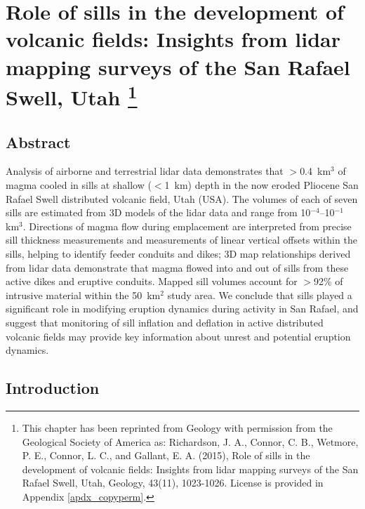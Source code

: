\chapter[Role of sills in the development of volcanic fields: Insights from lidar mapping surveys of the San Rafael Swell, Utah]{Role of sills in the development of volcanic fields: Insights from lidar mapping surveys of the San Rafael Swell, Utah \footnote{This chapter has been reprinted from Geology with permission from the Geological Society of America as: Richardson, J. A., Connor, C. B., Wetmore, P. E., Connor, L. C., and Gallant, E. A. (2015), Role of sills in the development of volcanic fields: Insights from lidar mapping surveys of the San Rafael Swell, Utah, Geology, 43(11), 1023-1026. License is provided in Appendix \ref{apdx_copyperm}.}}\label{ch_sills}


\renewcommand*{\FigPath}{figures/chapter-sills}

\section{Abstract}

Analysis of airborne and terrestrial lidar data demonstrates that $>$0.4~km$^3$ of magma cooled in sills at shallow ($<$1~km) depth in the now eroded Pliocene San Rafael Swell distributed volcanic field, Utah (USA). The volumes of each of seven sills are estimated from 3D models of the lidar data and range from 10$^{-4}$--10$^{-1}$ km$^3$. Directions of magma flow during emplacement are interpreted from precise sill thickness measurements and measurements of linear vertical offsets within the sills, helping to identify feeder conduits and dikes; 3D map relationships derived from lidar data demonstrate that magma flowed into and out of sills from these active dikes and eruptive conduits. Mapped sill volumes account for $>$92\% of intrusive material within the 50~km$^2$ study area. We conclude that sills played a significant role in modifying eruption dynamics during activity in San Rafael, and suggest that monitoring of sill inflation and deflation in active distributed volcanic fields may provide key information about unrest and potential eruption dynamics.


\section{Introduction}

